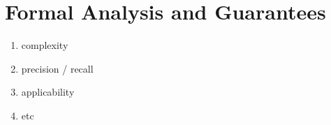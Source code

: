 \section{Formal Analysis and Guarantees}

\begin{enumerate}
	\item complexity
	\item precision / recall
	\item applicability
	\item etc
\end{enumerate}